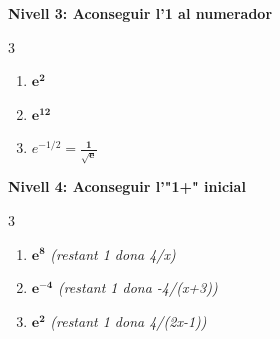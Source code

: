 \documentclass[12pt,a4paper]{article}
\begin{document}
\vspace{0.2cm}

\textbf{Nivell 3: Aconseguir l'1 al numerador}
\begin{multicols}{3}
\begin{enumerate}[label=3.3.\arabic*.]
    \item $\mathbf{e^2}$
    \item $\mathbf{e^{12}}$
    \item $e^{-1/2} = \mathbf{\frac{1}{\sqrt{e}}}$
\end{enumerate}
\end{multicols}

\vspace{0.2cm}

\textbf{Nivell 4: Aconseguir l'"1+" inicial}
\begin{multicols}{3}
\begin{enumerate}[label=3.4.\arabic*.]
    \item $\mathbf{e^8}$ \textit{(restant 1 dona 4/x)}
    \item $\mathbf{e^{-4}}$ \textit{(restant 1 dona -4/(x+3))}
    \item $\mathbf{e^2}$ \textit{(restant 1 dona 4/(2x-1))}
\end{enumerate}
\end{multicols}
\end{document}
